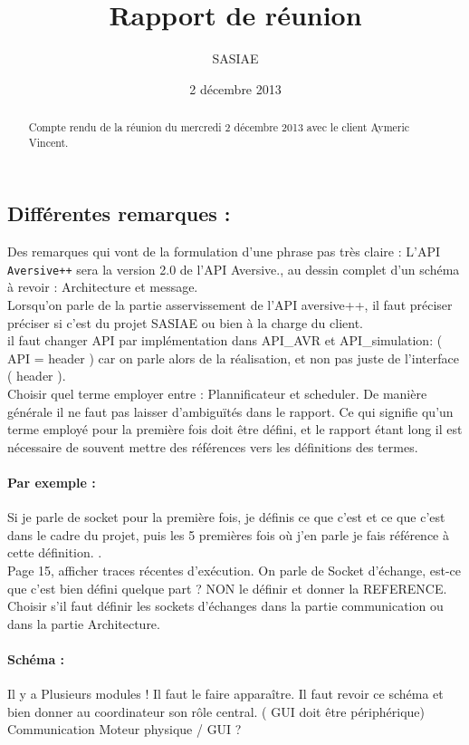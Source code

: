 \documentclass[a4paper,10pt]{article}
\title{Rapport de réunion}           %
\author{SASIAE}
\date{2 décembre 2013}
\begin{document}
\maketitle                    %

\begin{abstract}
Compte rendu de la réunion du mercredi 2 décembre 2013 avec le client Aymeric Vincent.
\end{abstract}
\subsection{Différentes remarques :}
Des remarques qui vont de la formulation d'une phrase pas très claire
: \og L'API \texttt{Aversive++} sera la version 2.0 de l'API
Aversive.\fg , au dessin complet d'un schéma à revoir : Architecture
et message.\\
Lorsqu'on parle de la partie asservissement de l'API aversive++, 
il faut préciser préciser si c'est du projet SASIAE ou bien à la
charge du client.\\
il faut changer \og API \fg par \og implémentation \fg dans API\_AVR
et API\_simulation: ( API = header ) car on parle alors de la
réalisation, et non pas juste de l'interface ( header ).\\
Choisir quel terme employer entre : Plannificateur  et scheduler. De
manière générale il ne faut pas laisser d'ambiguïtés dans le rapport. 
Ce qui signifie qu'un terme employé pour la première fois doit être
défini, et le rapport étant long il est nécessaire de souvent mettre
des références vers les définitions des termes.
\paragraph{Par exemple :} Si je parle de socket pour la première fois,
je définis ce que c'est et ce que c'est dans le cadre du projet, puis
les 5 premières fois où j'en parle je fais référence à cette
définition. \verbatim{\ref{} }.\\
Page 15, afficher traces récentes d'exécution. On parle de Socket
d'échange, est-ce que c'est bien défini quelque part ? NON le définir
et donner la REFERENCE.
Choisir s'il faut définir les sockets d'échanges dans la partie
communication ou dans la partie Architecture.\\
\paragraph{Schéma :}
Il y a Plusieurs modules ! Il faut le faire apparaître. Il faut revoir
ce schéma et bien donner au coordinateur son rôle central. ( GUI doit être
périphérique)\\
Communication Moteur physique / GUI ? 
\end{document}
